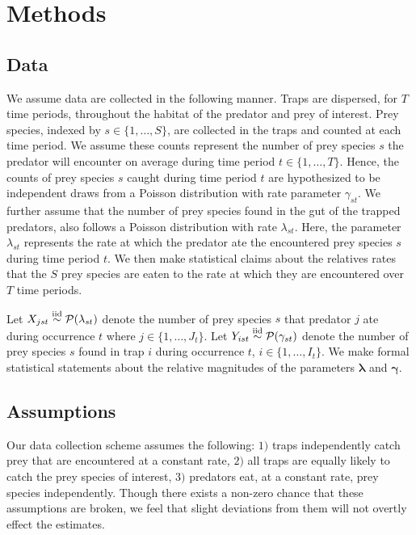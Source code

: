 \section*{Methods}
\label{sec:methods}

\subsection*{Data}

We assume data are collected in the following manner.  Traps are dispersed, for $T$ time periods, throughout the habitat of the predator and prey of interest.  Prey species, indexed by $s \in \{1, \ldots, S \}$, are collected in the traps and counted at each time period.  We assume these counts represent the number of prey species $s$ the predator will encounter on average during time period $t \in \{1, \ldots, T\}$.  Hence, the counts of prey species $s$ caught during time period $t$ are hypothesized to be independent draws from a Poisson distribution with rate parameter $\gamma_{st}$.  We further assume that the number of prey species found in the gut of the trapped predators, also follows a Poisson distribution with rate $\lambda_{st}$.  Here, the parameter $\lambda_{st}$ represents the rate at which the predator ate the encountered prey species $s$ during time period $t$.  We then make statistical claims about the relatives rates that the $S$ prey species are eaten to the rate at which they are encountered over $T$ time periods.  

Let $X_{jst} \stackrel{\mathrm{iid}}{\sim} \mathcal{P}(\lambda_{st})$ denote the number of prey species $s$ that predator $j$ ate during occurrence $t$ where $j \in \{1, \ldots, J_t\}$.  Let $Y_{ist} \stackrel{\mathrm{iid}}{\sim} \mathcal{P}(\gamma_{st})$ denote the number of prey species $s$ found in trap $i$ during occurrence $t$, $i \in \{1, \ldots, I_t\}$.  We make formal statistical statements about the relative magnitudes of the parameters $\boldsymbol{\lambda}$ and $\boldsymbol{\gamma}$.  

\subsection*{Assumptions}

Our data collection scheme assumes the following: $1)$ traps independently catch prey that are encountered at a constant rate, $2)$ all traps are equally likely to catch the prey species of interest, $3)$ predators eat, at a constant rate, prey species independently.  Though there exists a non-zero chance that these assumptions are broken, we feel that slight deviations from them will not overtly effect the estimates.  

